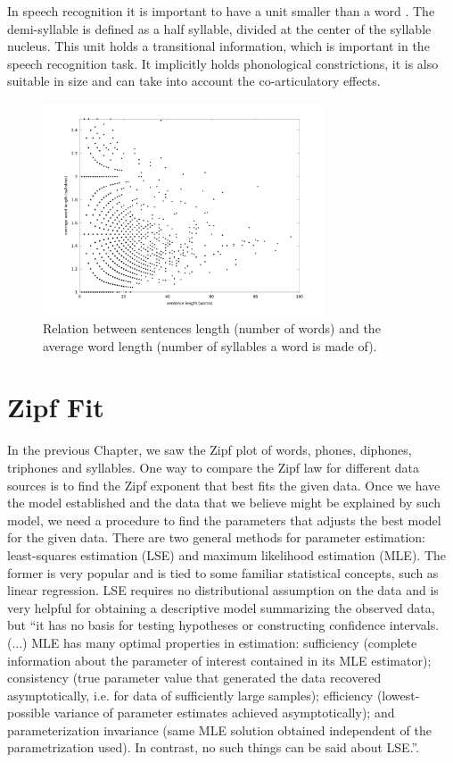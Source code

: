 In speech recognition it is important to have a unit smaller than a word \citep{Shoup1988}. The demi-syllable is defined
as a half syllable, divided at the center of the syllable nucleus. This unit holds a transitional information,
which is important in the speech recognition task. It implicitly holds phonological constrictions, it is 
also suitable in size and can take into account the co-articulatory effects.

\begin{figure}[h!]
\centering
\includegraphics[width=0.75\textwidth]{images/ulysses_words_sentence_word_length_syllables_z100.png}
\caption{Relation between sentences length (number of words) and the average word length (number of syllables a word is made of).}
\label{fig:ulysses_words_sentence_word_length_syllables_z100}
\end{figure} 



%
%
%
\section{Zipf Fit}
In the previous Chapter, we saw the Zipf plot of words, phones, diphones, triphones and syllables.
One way to compare the Zipf law for different data sources is to find the Zipf exponent that best
fits the given data. Once we have the model established and the data that we believe might be explained
by such model, we need a procedure to find the parameters that adjusts the best model for the given data.
There are two general methods for parameter estimation: least-squares estimation (LSE) and maximum likelihood 
estimation (MLE). The former is very popular and is tied to some familiar statistical concepts, such as linear
regression. LSE requires no distributional assumption on the data and is very helpful for obtaining a
descriptive model summarizing the observed data, but ``it has no basis for testing hypotheses or constructing
confidence intervals. (...) MLE has many optimal properties in estimation: sufficiency (complete information about 
the parameter of interest contained in its MLE estimator); consistency (true parameter value that generated the
data recovered asymptotically, i.e. for data of sufficiently large samples); efficiency (lowest-possible variance 
of parameter estimates achieved asymptotically); and parameterization invariance (same MLE solution obtained 
independent of the parametrization used). In contrast, no such things can be said about LSE.''\citep{myung2003}.


